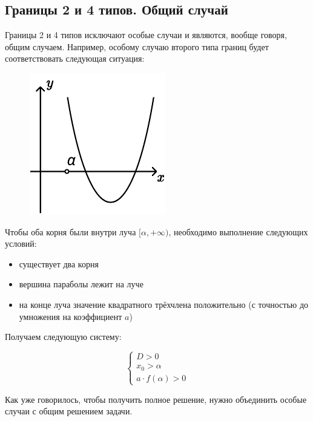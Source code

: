 \pagebreak

\subsection {Границы 2 и 4 типов. Общий случай}

Границы 2 и 4 типов исключают особые случаи и являются, вообще говоря, общим случаем.
Например, особому случаю второго типа границ будет соответствовать следующая ситуация:

\begin {figure} [h]
    \begin {minipage} [t] {\linewidth}
        \centering
        \includegraphics [width=0.3\linewidth] {image/image_11.pdf}
    \end {minipage}
\end {figure} 

Чтобы оба корня были внутри луча $[\alpha, +\infty)$, необходимо выполнение следующих условий:

\begin {itemize}
    \item {существует два корня}
    \item {вершина параболы лежит на луче}
    \item {на конце луча значение квадратного трёхчлена положительно (с точностью до умножения на
           коэффициент $a$)}
\end {itemize}

Получаем следующую систему:

\begin {equation*}
    \begin {cases}
        D > 0
        \\
        x_0 > \alpha
        \\
        a \cdot f(\alpha) > 0
    \end {cases}
\end {equation*}

Как уже говорилось, чтобы получить полное решение, нужно объединить особые случаи с общим решением
задачи. 
